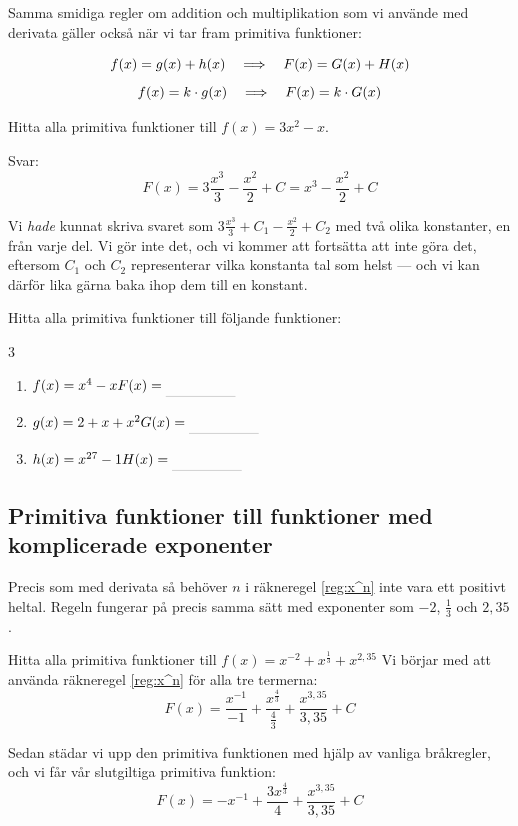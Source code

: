 \documentclass[a4paper, 12pt]{article}
\begin{document}
Samma smidiga regler om addition och multiplikation som vi använde med derivata gäller också när vi tar fram primitiva funktioner:
\begin{regel}
    \[f(x) = g(x) + h(x) \hspace{1em} \Longrightarrow \hspace{1em} F(x) = G(x) + H(x)\]
    \[f(x) = k\cdot g(x) \hspace{1em} \Longrightarrow \hspace{1em} F(x) = k\cdot G(x)\]
\end{regel}


\begin{exempel}
    Hitta alla primitiva funktioner till $f(x) = 3x^2 - x$.

    \dinkus
    Svar: \[F(x) = 3\dfrac {x^3}3 - \dfrac {x^2}2  + C= x^3 - \dfrac {x^2}2 + C\]

    Vi \emph{hade} kunnat skriva svaret som $3\frac {x^3}3 + C_1 - \frac {x^2}2  + C_2$ med två olika konstanter, en från varje del. Vi gör inte det, och vi kommer att fortsätta att inte göra det, eftersom $C_1$ och $C_2$ representerar vilka konstanta tal som helst --- och vi kan därför lika gärna baka ihop dem till en konstant.
\end{exempel}


\begin{uppgifter}
    \label{upp:sum}
    Hitta alla primitiva funktioner till följande funktioner: 
    \begin{multicols}{3}
        \begin{enumerate}
            \item $f(x) = x^4 - x \\ F(x) \ans$
            \item $g(x) = 2 + x + x^2 \\ G(x) \ans$
            \item $h(x) = x^{27} - 1 \\ H(x) \ans$
        \end{enumerate}
    \end{multicols}
\end{uppgifter}

\subsection{Primitiva funktioner till funktioner med komplicerade exponenter}
Precis som med derivata så behöver $n$ i räkneregel \ref{reg:x^n} inte vara ett positivt heltal. Regeln fungerar på precis samma sätt med exponenter som $-2$, $\frac 13$ och $2,35$.

\begin{exempel}
    Hitta alla primitiva funktioner till $f(x) = x^{-2} + x^\frac{1}{3} + x^{2,35}$
    \dinkus
    Vi börjar med att använda räkneregel \ref{reg:x^n} för alla tre termerna:
    \[F(x) = \dfrac {x^{-1}}{-1} + \dfrac {x^\frac{4}{3}}{\frac{4}{3}} + \dfrac {x^{3,35}}{3,35} + C \]
    
    Sedan städar vi upp den primitiva funktionen med hjälp av vanliga bråkregler, och vi får vår slutgiltiga primitiva funktion:
    \[F(x) = - x^{-1} + \dfrac {3x^\frac{4}{3}}{4} + \dfrac {x^{3,35}}{3,35} + C\]
\end{exempel}
\end{document}
